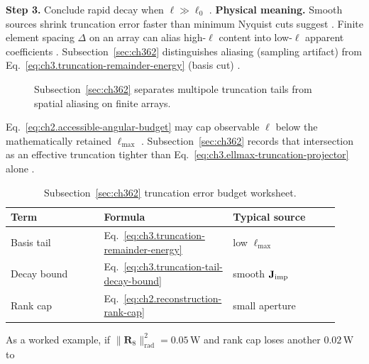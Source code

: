 \textbf{Step 3.} Conclude rapid decay when \(\ell\gg\ell_{0}\) \cite{harrington2001}.
\textbf{Physical meaning.} Smooth sources shrink truncation error faster than minimum Nyquist cuts suggest \cite{stratton1941}.
Finite element spacing \(\Delta\) on an array can alias high-\(\ell\) content into low-\(\ell\) apparent coefficients
\cite{harrington2001}. Subsection~\ref{sec:ch362} distinguishes aliasing (sampling artifact) from
Eq.~\eqref{eq:ch3.truncation-remainder-energy} (basis cut) \cite{hansen1988}.
\begin{figure}[t]
\centering
{}
\caption{Subsection~\ref{sec:ch362} separates multipole truncation tails from spatial aliasing on finite arrays.}
\label{fig:ch3.362-alias-truncation}
\end{figure}
Eq.~\eqref{eq:ch2.accessible-angular-budget} may cap observable \(\ell\) below the mathematically retained
\(\ell_{\max}\) \cite{harrington2001}. Subsection~\ref{sec:ch362} records that intersection as an
effective truncation tighter than Eq.~\eqref{eq:ch3.ellmax-truncation-projector} alone \cite{hansen1988}.
\begin{table}[t]
\centering
\caption{Subsection~\ref{sec:ch362} truncation error budget worksheet.}
\label{tab:ch3.362-error-worksheet}
\small
\begin{tabular}{@{}p{0.28\linewidth}p{0.32\linewidth}p{0.32\linewidth}@{}}
\toprule
Term & Formula & Typical source \\
\midrule
Basis tail & Eq.~\eqref{eq:ch3.truncation-remainder-energy} & low \(\ell_{\max}\) \\
Decay bound & Eq.~\eqref{eq:ch3.truncation-tail-decay-bound} & smooth \(\mathbf{J}_{\mathrm{imp}}\) \\
Rank cap & Eq.~\eqref{eq:ch2.reconstruction-rank-cap} & small aperture \\
\bottomrule
\end{tabular}
\end{table}
As a worked example, if \(\|\mathbf{R}_{8}\|_{\mathrm{rad}}^{2}=0.05\,\mathrm{W}\) and rank cap loses another \(0.02\,\mathrm{W}\) to
